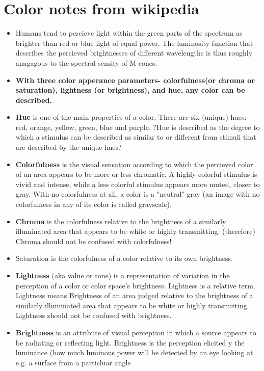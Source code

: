 \section{Color notes from wikipedia}
\begin{itemize}
\item Humans tend to percieve light within the green parts of the spectrum as brighter than
red or blue light of equal power. The luminosity function that describes the percieved brightnesses
of different wavelengths is thus roughly anagagous to the spectral sensity of M cones.
\item \textbf{With three color apperance parameters- colorfulness(or chroma or saturation), lightness 
   (or brightness), and hue, any color can be described.}
\item \textbf{Hue} is one of the main properties of a color. There are six (unique) hues: 
   red, orange, yellow, green, blue and purple. ?Hue is described as the degree to which
   a stimulus can be described as similar to or different from stimuli that are described by the unique
   hues?
\item \textbf{Colorfulness} is the visual sensation according to which the percieved color of an area appears
   to be more or less chromatic. A highly colorful stimulus is vivid and intense, while a less colorful
   stimulus appears more muted, closer to gray. With no colorfulness at all, a color is a
   "neutral" gray (an image with no colorfulness in any of its color is called grayscale).
\item \textbf{Chroma} is the colorfulness relative to the brightness of a similarly illuminated area that 
   appears to be white or highly transmitting. (therefore) Chroma should not be confused with colorfulness!
\item Saturation is the colorfulness of a color relative to its own brightness.
\item \textbf{Lightness} (aka value or tone) is a representation of variation in the perception of
   a color or color space's brightness. Lightness is a relative term. Lightness means Brightness
   of an area judged relative to the brightness of a similarly illuminated area that appears to be white 
   or highly transmitting. Lightness should not be confused with brightness.
\item \textbf{Brightness} is an attribute of visual perception in which a source appears
   to be radiating or reflecting light. Brightness is the perception elicited y the luminance 
   (how much luminous power will be detected by an eye looking at e.g. a surface from a particluar angle

\end{itemize}
